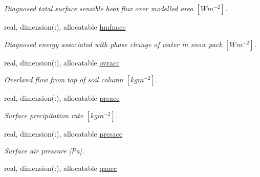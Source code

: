 \begin{DoxyCompactItemize}
\begin{DoxyCompactList}\small\item\em Diagnosed total surface sensible heat flux over modelled area $[W m^{-2} ]$. \end{DoxyCompactList}\item 
\hypertarget{structclass__statevars_1_1class__rotated_a7a42cac9c3f4d5ea85c500c28d3af115}{}real, dimension(\+:), allocatable \hyperlink{structclass__statevars_1_1class__rotated_a7a42cac9c3f4d5ea85c500c28d3af115}{hmfnacc}\label{structclass__statevars_1_1class__rotated_a7a42cac9c3f4d5ea85c500c28d3af115}

\begin{DoxyCompactList}\small\item\em Diagnosed energy associated with phase change of water in snow pack $[W m^{-2} ]$. \end{DoxyCompactList}\item 
\hypertarget{structclass__statevars_1_1class__rotated_a4bcb2844370f2f7d81066556e20ff450}{}real, dimension(\+:), allocatable \hyperlink{structclass__statevars_1_1class__rotated_a4bcb2844370f2f7d81066556e20ff450}{ovracc}\label{structclass__statevars_1_1class__rotated_a4bcb2844370f2f7d81066556e20ff450}

\begin{DoxyCompactList}\small\item\em Overland flow from top of soil column $[kg m^{-2} ]$. \end{DoxyCompactList}\item 
\hypertarget{structclass__statevars_1_1class__rotated_a2eb5aad861f2f1f0e6bd82a300e48139}{}real, dimension(\+:), allocatable \hyperlink{structclass__statevars_1_1class__rotated_a2eb5aad861f2f1f0e6bd82a300e48139}{preacc}\label{structclass__statevars_1_1class__rotated_a2eb5aad861f2f1f0e6bd82a300e48139}

\begin{DoxyCompactList}\small\item\em Surface precipitation rate $[kg m^{-2} ]$. \end{DoxyCompactList}\item 
\hypertarget{structclass__statevars_1_1class__rotated_afdefbedac16285fac58e8037bbf3bfec}{}real, dimension(\+:), allocatable \hyperlink{structclass__statevars_1_1class__rotated_afdefbedac16285fac58e8037bbf3bfec}{presacc}\label{structclass__statevars_1_1class__rotated_afdefbedac16285fac58e8037bbf3bfec}

\begin{DoxyCompactList}\small\item\em Surface air pressure \mbox{[}Pa\mbox{]}. \end{DoxyCompactList}\item 
\hypertarget{structclass__statevars_1_1class__rotated_a8a0b0cbf6fd1e424423e5511996c3513}{}real, dimension(\+:), allocatable \hyperlink{structclass__statevars_1_1class__rotated_a8a0b0cbf6fd1e424423e5511996c3513}{qaacc}\label{structclass__statevars_1_1class__rotated_a8a0b0cbf6fd1e424423e5511996c3513}


\end{DoxyCompactItemize}
